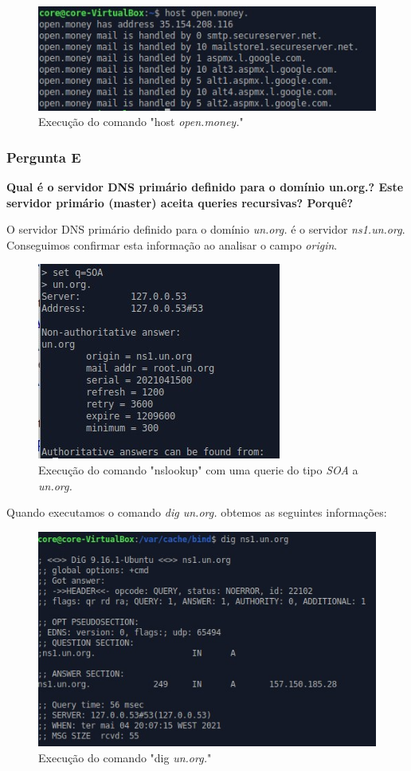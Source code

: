 \documentclass[11pt]{article}
\begin{document}
\begin{figure}[!htb]
    \centering
    \includegraphics[width=.8\textwidth]{images/Parte1/p1_d.jpg}
    \caption{Execução do comando "host \textit{open.money.}"}
    \label{fig:hostopenmoney}
\end{figure}


\subsubsection{Pergunta E}

\textbf{Qual é o servidor DNS primário definido para o domínio un.org.? Este servidor primário (master) aceita queries recursivas? Porquê?}

\par O servidor DNS primário definido para o domínio \textit{un.org.} é o servidor \textit{ns1.un.org}. Conseguimos confirmar esta informação ao analisar o campo \textit{origin}.

\begin{figure}[!htb]
    \centering
    \includegraphics[width=.4\textwidth]{images/Parte1/p1_e.jpg}
    \caption{Execução do comando "nslookup" com uma querie do tipo \textit{SOA} a \textit{un.org.}}
    \label{fig:soaunorg}
\end{figure}

\par Quando executamos o comando \textit{dig un.org.} obtemos as seguintes informações:

\begin{figure}[!htb]
    \centering
    \includegraphics[width=.5\textwidth]{images/Parte1/p1_e2.jpg}
    \caption{Execução do comando "dig \textit{un.org.}"}
    \label{fig:digunorg}
\end{figure}
\end{document}
